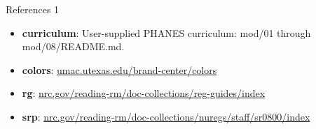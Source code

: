 \documentclass[aspectratio=169,11pt]{beamer}
\begin{document}
\begin{frame}[t]{References 1}
\fontsize{9}{12}\selectfont\begin{itemize}\setlength{\itemsep}{3mm}
\item \textbf{curriculum}: User-supplied PHANES curriculum: mod/01 through mod/08/README.md.
\item \textbf{colors}: \href{https://umac.utexas.edu/brand-center/colors/}{umac.utexas.edu/brand-center/colors}
\item \textbf{rg}: \href{https://www.nrc.gov/reading-rm/doc-collections/reg-guides/index}{nrc.gov/reading-rm/doc-collections/reg-guides/index}
\item \textbf{srp}: \href{https://www.nrc.gov/reading-rm/doc-collections/nuregs/staff/sr0800/index}{nrc.gov/reading-rm/doc-collections/nuregs/staff/sr0800/index}
\end{itemize}\end{frame}
\end{document}
